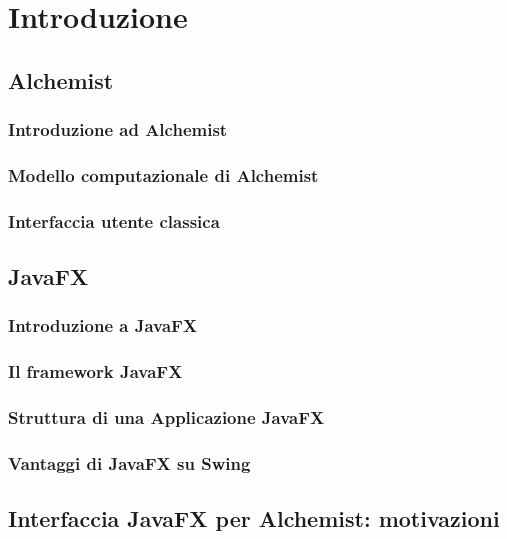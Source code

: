 

\chapter{Introduzione}\label{ch:intro}
\section{Alchemist}\label{sec:alchemist}
\subsection{Introduzione ad Alchemist}\label{sub:introAlchemist}
\subsection{Modello computazionale di Alchemist}\label{sub:modelloComputazionale}
\subsection{Interfaccia utente classica}\label{sub:prevGui}
\section{JavaFX}\label{sec:jfx}
\subsection{Introduzione a JavaFX}\label{sub:jfxIntro}
\subsection{Il framework JavaFX}\label{sub:jfxFramework}
\subsection{Struttura di una Applicazione JavaFX}\label{sub:jfxStruttura}
\subsection{Vantaggi di JavaFX su Swing}\label{sub:jfxVantaggi}
\section{Interfaccia JavaFX per Alchemist: motivazioni}\label{sec:motivi}
